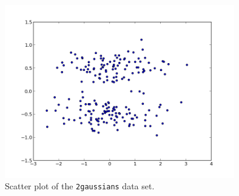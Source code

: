\documentclass[a4paper, 12pt, titlepage]{article}
\begin{document}
\begin{figure}
	\centering
	\includegraphics[width=10cm]{images/scatter2Gaussians.png}
	\caption{Scatter plot of the \texttt{2gaussians} data set.}
	\label{fig:scatter2Gaussians}
\end{figure}
\end{document}
